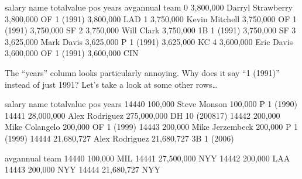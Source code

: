 \documentclass[letterpaper,10pt,english]{sphinxmanual}
\begin{document}
\begin{sphinxVerbatim}[commandchars=\\\{\}]
   
    
\end{sphinxVerbatim}

\begin{sphinxVerbatim}[commandchars=\\\{\}]
        salary               name  total\PYGZus{}value pos     years   avg\PYGZus{}annual team
0  \PYGZdl{} 3,800,000  Darryl Strawberry  \PYGZdl{} 3,800,000  OF  1 (1991)  \PYGZdl{} 3,800,000  LAD
1  \PYGZdl{} 3,750,000     Kevin Mitchell  \PYGZdl{} 3,750,000  OF  1 (1991)  \PYGZdl{} 3,750,000   SF
2  \PYGZdl{} 3,750,000         Will Clark  \PYGZdl{} 3,750,000  1B  1 (1991)  \PYGZdl{} 3,750,000   SF
3  \PYGZdl{} 3,625,000         Mark Davis  \PYGZdl{} 3,625,000   P  1 (1991)  \PYGZdl{} 3,625,000   KC
4  \PYGZdl{} 3,600,000         Eric Davis  \PYGZdl{} 3,600,000  OF  1 (1991)  \PYGZdl{} 3,600,000  CIN
\end{sphinxVerbatim}

The “years” column looks particularly annoying.  Why does it say “1 (1991)” instead of just 1991?  Let’s take a look at some other rows…

\begin{sphinxVerbatim}[commandchars=\\\{\}]
\PYG{p}{[}\PYG{p}{]}
\end{sphinxVerbatim}

\begin{sphinxVerbatim}[commandchars=\\\{\}]
             salary             name    total\PYGZus{}value pos         years  \PYGZbs{}
14440     \PYGZdl{} 100,000     Steve Monson      \PYGZdl{} 100,000   P      1 (1990)   
14441  \PYGZdl{} 28,000,000   Alex Rodriguez  \PYGZdl{} 275,000,000  DH  10 (2008\PYGZhy{}17)   
14442     \PYGZdl{} 200,000   Mike Colangelo      \PYGZdl{} 200,000  OF      1 (1999)   
14443     \PYGZdl{} 200,000  Mike Jerzembeck      \PYGZdl{} 200,000   P      1 (1999)   
14444  \PYGZdl{} 21,680,727   Alex Rodriguez   \PYGZdl{} 21,680,727  3B      1 (2006)   

         avg\PYGZus{}annual team  
14440     \PYGZdl{} 100,000  MIL  
14441  \PYGZdl{} 27,500,000  NYY  
14442     \PYGZdl{} 200,000  LAA  
14443     \PYGZdl{} 200,000  NYY  
14444  \PYGZdl{} 21,680,727  NYY  
\end{sphinxVerbatim}
\end{document}
